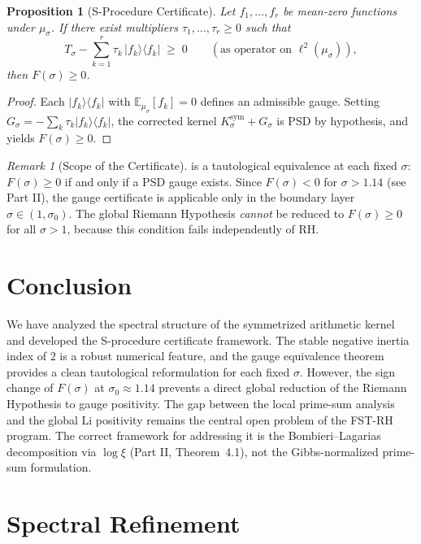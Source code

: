 \documentclass[12pt,a4paper]{article}
\newtheorem{proposition}[theorem]{Proposition}
\theoremstyle{definition}
\theoremstyle{remark}
\newtheorem{remark}[theorem]{Remark}
\newcommand{\Ksym}{K_\sigma^{\mathrm{sym}}}
\newcommand{\EE}{\mathbb{E}}
\newcommand{\muG}{\mu_\sigma}
\begin{document}
\begin{proposition}[S-Procedure Certificate]\label{prop:s-cert}
Let $f_1, \ldots, f_r$ be mean-zero functions under $\muG$. If there exist multipliers $\tau_1, \ldots, \tau_r \ge 0$ such that
\[ T_\sigma - \sum_{k=1}^{r} \tau_k\,|f_k\rangle\langle f_k| \;\ge\; 0 \qquad (\text{as operator on } \ell^2(\muG)), \]
then $F(\sigma) \ge 0$.
\end{proposition}
\begin{proof}
Each $|f_k\rangle\langle f_k|$ with $\EE_{\muG}[f_k] = 0$ defines an admissible gauge. Setting $G_\sigma = -\sum_k \tau_k |f_k\rangle\langle f_k|$, the corrected kernel $\Ksym + G_\sigma$ is PSD by hypothesis, and  yields $F(\sigma) \ge 0$.
\end{proof}

\begin{remark}[Scope of the Certificate]
 is a tautological equivalence at each fixed $\sigma$: $F(\sigma) \ge 0$ if and only if a PSD gauge exists. Since $F(\sigma) < 0$ for $\sigma > 1.14$ (see Part II), the gauge certificate is applicable only in the boundary layer $\sigma \in (1, \sigma_0)$. The global Riemann Hypothesis \emph{cannot} be reduced to $F(\sigma) \ge 0$ for all $\sigma > 1$, because this condition fails independently of RH.
\end{remark}

\section{Conclusion}

We have analyzed the spectral structure of the symmetrized arithmetic kernel and developed the S-procedure certificate framework. The stable negative inertia index of $2$ is a robust numerical feature, and the gauge equivalence theorem provides a clean tautological reformulation for each fixed $\sigma$. However, the sign change of $F(\sigma)$ at $\sigma_0 \approx 1.14$ prevents a direct global reduction of the Riemann Hypothesis to gauge positivity. The gap between the local prime-sum analysis and the global Li positivity remains the central open problem of the FST-RH program. The correct framework for addressing it is the Bombieri--Lagarias decomposition via $\log\xi$ (Part II, Theorem~4.1), not the Gibbs-normalized prime-sum formulation.

\appendix
\section{Spectral Refinement}
\end{document}
